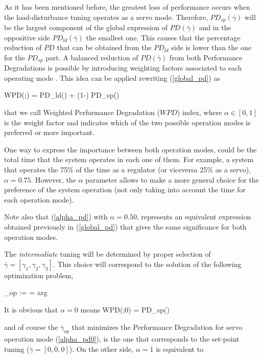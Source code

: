 As it has been mentioned before, the greatest loss of performance
occurs when the load-disturbance tuning operates as a servo mode.
Therefore, $PD_{sp}(\overline{\gamma})$ will be the largest
component of the global expression of $PD(\overline{\gamma})$ and
in the oppositive side $PD_{ld}(\overline{\gamma})$ the smallest
one. This causes that the percentage reduction of $\mathit{PD}$
that can be obtained from the $PD_{ld}$ side is lower than the one
for the $PD_{sp}$ part. A balanced reduction of
$PD(\overline{\gamma})$ from both Performance Degradations is
possible by introducing weighting factors associated to each
operating mode \cite{arrietaCSC2007}. This idea can be applied
rewriting (\ref{global_pd}) as

\be WPD(\overline{\gamma};\alpha) = \alpha
PD_{ld}(\overline{\gamma}) + (1-\alpha) PD_{sp}(\overline{\gamma})
\label{alpha_pd} \ee

\noindent that we call Weighted Performance Degradation
($\mathit{WPD}$) index, where $\alpha \in [0,1]$ is the weight
factor and indicates which of the two possible operation modes is
preferred or more important.

One way to express the importance between both operation modes,
could be the total time that the system operates in each one of
them. For example, a system that operates the 75\% of the time as
a regulator (or viceversa 25\% as a servo), $\alpha=0.75$.
However, the $\alpha$ parameter allows to make a more general
choice for the preference of the system operation (not only taking
into account the time for each operation mode).

Note also that (\ref{alpha_pd}) with $\alpha=0.50$, represents an
equivalent expression obtained previously in (\ref{global_pd})
that gives the same significance for both operation modes.

The \emph{intermediate} tuning will be determined by proper
selection of $\overline{\gamma} = \left [\gamma_1, \gamma_2,
\gamma_3 \right]$. This choice will correspond to the solution of
the following optimization problem,

\be \overline{\gamma}_{op} :=  = arg 
\label{gamma_optimization}\ee

It is obvious that $\alpha=0$ means \be WPD(\overline{\gamma};0) =
PD_{sp}(\overline{\gamma}) \label{alpha_pd0} \ee

\noindent and of course the $\overline{\gamma}_{op}$ that
minimizes the Performance Degradation for servo operation mode
(\ref{alpha_pd0}), is the one that corresponds to the set-point
tuning ($\overline{\gamma}=[0,0,0]$). On the other side,
$\alpha=1$ is equivalent to

